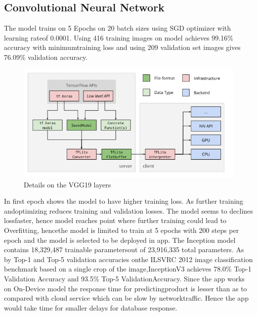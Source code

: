 \subsection{Convolutional Neural Network}
The model trains on 5 Epochs on 20 batch sizes using SGD optimizer with learning rateof 0.0001. Using 416 training images on model achieves 99.16\% accuracy with minimumtraining loss and using 209 validation set images gives 76.09\% validation accuracy.\\
\begin{figure}[H]
	\label{ss}
	\centering
	\includegraphics[width=15cm,keepaspectratio]{tflite-converter-workflow.png}
	\caption{Details on the VGG19 layers}
\end{figure}
In first epoch shows the model to have higher training loss.  As further training andoptimizing  reduces  training  and  validation  losses.   The  model  seems  to  declines  lossfaster, hence model reaches point where further training could lead to Overfitting, hencethe model is limited to train at 5 epochs with 200 steps per epoch and the model is selected to be deployed in app.  The Inception model contains 18,329,487 trainable parametersout  of  23,916,335  total  parameters.   As  by  Top-1  and  Top-5  validation  accuracies  onthe ILSVRC 2012 image classification benchmark based on a single crop of the image,InceptionV3  achieves  78.0\%  Top-1  Validation  Accuracy  and  93.5\%  Top-5  ValidationAccuracy.  Since the app works on On-Device model the response time for predictingproduct is lesser than as to compared with cloud service which can be slow by networktraffic. Hence the app would take time for smaller delays for database response.


